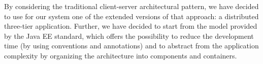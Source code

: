 By considering the traditional client-server architectural pattern, we have decided to use for our system one of the extended versions of that approach: a distributed three-tier application.
\newline
Further, we have decided to start from the model provided by the Java EE standard, which offers the possibility to reduce the development time (by using conventions and annotations) and to abstract from the application complexity by organizing the architecture into components and containers.